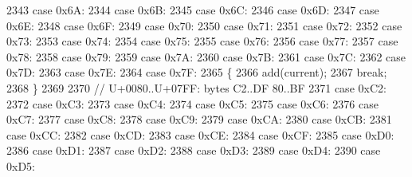\begin{DoxyCode}
2343                 \textcolor{keywordflow}{case} 0x6A:
2344                 \textcolor{keywordflow}{case} 0x6B:
2345                 \textcolor{keywordflow}{case} 0x6C:
2346                 \textcolor{keywordflow}{case} 0x6D:
2347                 \textcolor{keywordflow}{case} 0x6E:
2348                 \textcolor{keywordflow}{case} 0x6F:
2349                 \textcolor{keywordflow}{case} 0x70:
2350                 \textcolor{keywordflow}{case} 0x71:
2351                 \textcolor{keywordflow}{case} 0x72:
2352                 \textcolor{keywordflow}{case} 0x73:
2353                 \textcolor{keywordflow}{case} 0x74:
2354                 \textcolor{keywordflow}{case} 0x75:
2355                 \textcolor{keywordflow}{case} 0x76:
2356                 \textcolor{keywordflow}{case} 0x77:
2357                 \textcolor{keywordflow}{case} 0x78:
2358                 \textcolor{keywordflow}{case} 0x79:
2359                 \textcolor{keywordflow}{case} 0x7A:
2360                 \textcolor{keywordflow}{case} 0x7B:
2361                 \textcolor{keywordflow}{case} 0x7C:
2362                 \textcolor{keywordflow}{case} 0x7D:
2363                 \textcolor{keywordflow}{case} 0x7E:
2364                 \textcolor{keywordflow}{case} 0x7F:
2365                 \{
2366                     add(current);
2367                     \textcolor{keywordflow}{break};
2368                 \}
2369 
2370                 \textcolor{comment}{// U+0080..U+07FF: bytes C2..DF 80..BF}
2371                 \textcolor{keywordflow}{case} 0xC2:
2372                 \textcolor{keywordflow}{case} 0xC3:
2373                 \textcolor{keywordflow}{case} 0xC4:
2374                 \textcolor{keywordflow}{case} 0xC5:
2375                 \textcolor{keywordflow}{case} 0xC6:
2376                 \textcolor{keywordflow}{case} 0xC7:
2377                 \textcolor{keywordflow}{case} 0xC8:
2378                 \textcolor{keywordflow}{case} 0xC9:
2379                 \textcolor{keywordflow}{case} 0xCA:
2380                 \textcolor{keywordflow}{case} 0xCB:
2381                 \textcolor{keywordflow}{case} 0xCC:
2382                 \textcolor{keywordflow}{case} 0xCD:
2383                 \textcolor{keywordflow}{case} 0xCE:
2384                 \textcolor{keywordflow}{case} 0xCF:
2385                 \textcolor{keywordflow}{case} 0xD0:
2386                 \textcolor{keywordflow}{case} 0xD1:
2387                 \textcolor{keywordflow}{case} 0xD2:
2388                 \textcolor{keywordflow}{case} 0xD3:
2389                 \textcolor{keywordflow}{case} 0xD4:
2390                 \textcolor{keywordflow}{case} 0xD5:

\end{DoxyCode}
